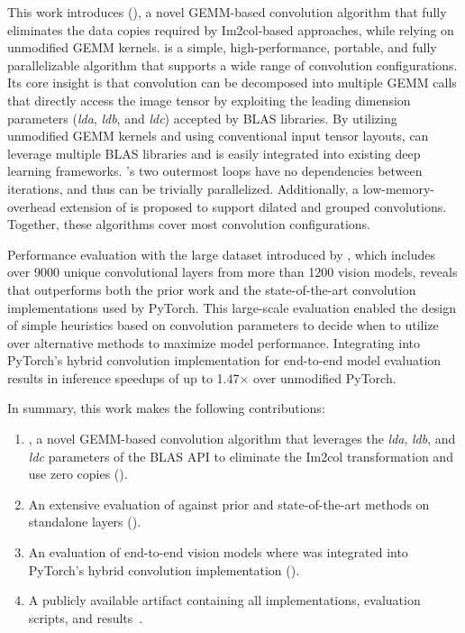 This work introduces \algfullname (\algname), a novel GEMM-based convolution algorithm that fully eliminates the data copies required by Im2col-based approaches, while relying on unmodified GEMM kernels.
\algname is a simple, high-performance, portable, and fully parallelizable algorithm that supports a wide range of convolution configurations.
Its core insight is that convolution can be decomposed into multiple GEMM calls that directly access the image tensor by exploiting the leading dimension parameters (\emph{lda}, \emph{ldb}, and \emph{ldc}) accepted by BLAS libraries.
By utilizing unmodified GEMM kernels and using conventional input tensor layouts, \algname can leverage multiple BLAS libraries and is easily integrated into existing deep learning frameworks.
\algname's two outermost loops have no dependencies between iterations, and thus can be trivially parallelized.
Additionally, a low-memory-overhead extension of \algname is proposed to support dilated and grouped convolutions.
Together, these algorithms cover most convolution configurations.

Performance evaluation with the large dataset introduced by \citet{convbench}, which includes over 9000 unique convolutional layers from more than 1200 vision models, reveals that \algname outperforms both the prior work and the state-of-the-art convolution implementations used by PyTorch.
This large-scale evaluation enabled the design of simple heuristics based on convolution parameters to decide when to utilize \algname over alternative methods to maximize model performance.
Integrating \algname into PyTorch's hybrid convolution implementation for end-to-end model evaluation results in inference speedups of up to 1.47$\times$ over unmodified PyTorch.

In summary, this work makes the following contributions: 
\begin{enumerate}[label=(\roman*),noitemsep,topsep=0pt] 
    \item \algname, a novel GEMM-based convolution algorithm that leverages the \emph{lda}, \emph{ldb}, and \emph{ldc} parameters of the BLAS API to eliminate the Im2col transformation and use zero copies ().
    \item An extensive evaluation of \algname against prior and state-of-the-art methods on standalone layers ().
    \item An evaluation of end-to-end vision models where \algname was integrated into PyTorch's hybrid convolution implementation ().
    \item A publicly available artifact containing all implementations, evaluation scripts, and results~\cite{zconvartifact}.
\end{enumerate}
